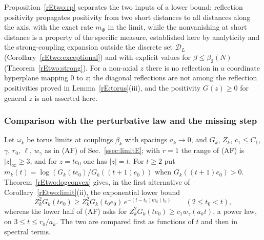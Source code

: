 \begin{remark}\label{rEtwo:rpremark}
Proposition~\ref{rEtwo:rp} separates the two inputs of a lower bound:
reflection positivity propagates positivity from two short distances to
all distances along the axis, with the exact rate $m_\Phi$ in the limit,
while the nonvanishing at short distance is a property of the specific
measure, established here by analyticity and the strong-coupling
expansion outside the discrete set $\mathcal D_L$
(Corollary~\ref{rEtwo:exceptional}) and with explicit values for
$\beta\le\beta_2(N)$ (Theorem~\ref{rEtwo:strong}). For a non-axial $z$
there is no reflection in a coordinate hyperplane mapping $0$ to $z$; the
diagonal reflections are not among the reflection positivities proved in
Lemma~\ref{rE:torus}(iii), and the positivity $G(z)\ge0$ for general $z$
is not asserted here.
\end{remark}

\subsubsection{Comparison with the perturbative law and the missing step}

Let $\omega_k$ be torus limits at couplings $\beta_k$ with spacings $a_k
\to0$, and $G_k$, $Z_k$, $c_1\le C_1$, $\gamma$, $r_0$, $\ell$, $w_\gamma$
as in (AF) of Sec.~\ref{ssec:limitE}; with $r=1$ the range of (AF) is
$|z|_\infty\ge3$, and for $z=te_0$ one has $|z|=t$. For $t\ge2$ put
$m_k(t)=\log(G_k(te_0)/G_k((t+1)e_0))$ when $G_k((t+1)e_0)>0$.
Theorem~\ref{rEtwo:logconvex} gives, in the first alternative of
Corollary~\ref{rEtwo:limit}(ii), the exponential lower bound
\begin{equation}\label{rEtwo:eqsecant}
Z_k^2G_k(te_0)\ge Z_k^2G_k(t_0e_0)\,e^{-(t-t_0)m_k(t_0)}\qquad(2\le t_0<t),
\end{equation}
whereas the lower half of (AF) asks for $Z_k^2G_k(te_0)\ge c_1w_\gamma(a_k
t)$, a power law, on $3\le t\le r_0/a_k$. The two are compared first as
functions of $t$ and then in spectral terms.


